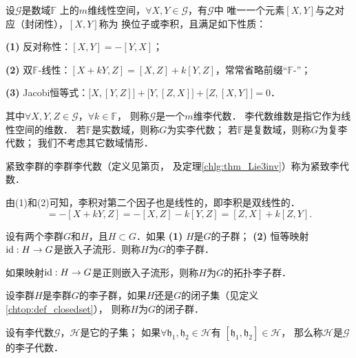 \begin{definition}\label{chlg:def_la}
    设$\mathscr{G}$是数域$\mathbb{F}$ 
    上的$m$维线性空间，$\forall X,Y \in \mathscr{G}$，有$\mathscr{G}$中
    唯一一个元素$[X,Y]$与之对应（{\heiti 封闭性}），$[X,Y]$称为
    换位子或{\heiti 李积}，且满足如下性质：
    
    {\bfseries (1)} 反对称性：$[X,Y]=-[Y,X]$；
    
    {\bfseries (2)} 双$\mathbb{F}$-线性：$[ X + k Y, Z]= [X, Z]+ k[Y, Z]$，常常省略前缀“$\mathbb{F}$-”；
    
    {\bfseries (3)} Jacobi恒等式：$\bigl[X,[Y,Z]\bigr]+\bigl[Y,[Z,X]\bigr]+\bigl[Z,[X,Y]\bigr]=0$．
    
\noindent    其中$\forall X, Y, Z \in \mathscr{G}$，$\forall k \in \mathbb{F}$，
    则称$\mathscr{G}$是一个$m$维{\heiti 李代数}．
    李代数维数是指它作为线性空间的维数．
    若$\mathbb{F}$是实数域，则称$G$为{\heiti 实李代数}；
    若$\mathbb{F}$是复数域，则称$G$为{\heiti 复李代数}；
    我们不考虑其它数域情形．
    
    紧致李群的李群李代数（定义见第\pageref{chlg:eqn_LgXY}页，
    及定理\ref{chlg:thm_Lie3inv}）称为{\heiti 紧致李代数}．
\end{definition}


由(1)和(2)可知，李积对第二个因子也是线性的，即李积是双线性的．
\begin{equation*}
    [Z,  X + k Y]= -[ X + k Y, Z]= -[X, Z]- k[Y, Z] = [Z,X]+ k[Z, Y].
\end{equation*}



\begin{definition}
    设有两个李群$G$和$H$，且$H\subset G$．如果 {\bfseries (1)} $H$是$G$的子群；
    {\bfseries (2)} 恒等映射${\rm id}:H\to G$是嵌入子流形．则称$H$为$G$的{\heiti 李子群}．
    
    如果映射${\rm id}:H\to G$是正则嵌入子流形，则称$H$为$G$的{\heiti 拓扑李子群}．
\end{definition}

\begin{definition}
    设李群$H$是李群$G$的李子群，如果$H$还是$G$的闭子集（见定义\ref{chtop:def_closedset}），
    则称$H$为$G$的{\heiti 闭子群}．
\end{definition}

\begin{definition}
    设有李代数$\mathscr{G}$，$\mathscr{H}$是它的子集；
    如果$\forall \mathfrak{h}_1,\mathfrak{h}_2\in \mathscr{H}$有
    $[\mathfrak{h}_1,\mathfrak{h}_2]\in \mathscr{H}$，
    那么称$\mathscr{H}$是$\mathscr{G}$的{\heiti 李子代数}．
\end{definition}

